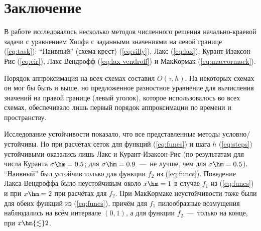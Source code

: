 \documentclass[a4paper,12pt]{article}
\begin{document}
\section{Заключение}
  В работе исследовалось несколько методов численного решения начально-краевой задачи с уравнением Хопфа с заданными значениями на левой границе (\ref{eq:task}): "`Наивный"' (схема крест) (\ref{eq:silly}), Лакс (\ref{eq:lax}), Курант-Изаксон-Рис (\ref{eq:cir}), Лакс-Вендрофф (\ref{eq:lax-vendroff}) и МакКормак (\ref{eq:maccormack}).
  
  Порядок аппроксимация на всех схемах составил $O(\tau, h)$.
  На некоторых схемах он мог бы быть и выше, но предложенное разностное уравнение для вычисления значений на правой границе (левый уголок), которое использовалось во всех схемах, обеспечивало лишь первый порядок аппроксимации по времени и пространству.
  
  Исследование устойчивости показало, что все представленные методы условно\-/устойчивы.
  Но при расчётах сеток для функций (\ref{eq:funcs}) и шага $h$ (\ref{eq:steps}) устойчивыми оказались лишь Лакс и Курант-Изаксон-Рис (по результатам для числа Куранта $\sigma \hm= 0.5$; для $\sigma \hm= 0.9$~---~не лучше, чем для $\sigma \hm= 0.5$).
  "`Наивный"' был устойчив только для функции $f_2$ из (\ref{eq:funcs}).
  Поведение Лакса-Вендроффа было неустойчивым около $x \hm= 1$ в случае $f_1$ из (\ref{eq:funcs}) и при $x \hm= 2$ при расчётах для $f_2$.
  При МакКормаке неустойчивости тоже были для обеих функций из (\ref{eq:funcs}), причём для $f_1$ пилообразные возмущения наблюдались на всём интервале $(0, 1)$, а для функции $f_2$~---~только на конце, при $x \hm{\lesssim} 2$.
  \newpage
  
\end{document}
